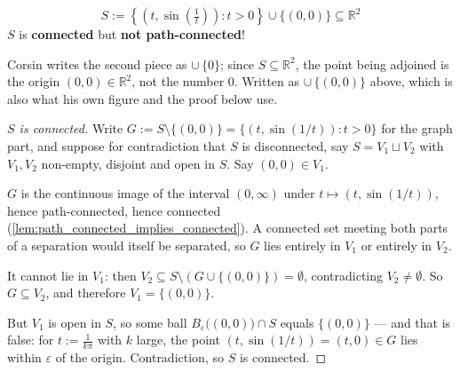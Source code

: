 \begin{example}
\label{ex:topologists_sine_curve}
\[S := \left\{\left(t, \sin\left(\tfrac{1}{t}\right)\right) : t > 0\right\} \cup \{(0,0)\} \subseteq \mathbb{R}^2\]
$S$ is \textbf{connected} but \textbf{not path-connected}!
\end{example}

\begin{ainote}
Corsin writes the second piece as $\cup\,\{0\}$; since $S \subseteq \mathbb{R}^2$, the point
being adjoined is the origin $(0,0) \in \mathbb{R}^2$, not the number $0$. Written as
$\cup\,\{(0,0)\}$ above, which is also what his own figure and the proof below use.
\end{ainote}

\begin{center}
\end{center}

\begin{proof}[$S$ is connected]
Write $G := S \setminus \{(0,0)\} = \{(t,\sin(1/t)) : t>0\}$ for the graph part, and suppose for
contradiction that $S$ is disconnected, say $S = V_1 \sqcup V_2$ with $V_1,V_2$ non-empty,
disjoint and open in $S$. Say $(0,0) \in V_1$.

$G$ is the continuous image of the interval $(0,\infty)$ under
$t \mapsto (t,\sin(1/t))$, hence path-connected, hence connected
(\cref{lem:path_connected_implies_connected}). A connected set meeting both parts of a
separation would itself be separated, so $G$ lies entirely in $V_1$ or entirely in $V_2$.

It cannot lie in $V_1$: then $V_2 \subseteq S \setminus (G \cup \{(0,0)\}) = \emptyset$,
contradicting $V_2 \neq \emptyset$. So $G \subseteq V_2$, and therefore
$V_1 = \{(0,0)\}$.

But $V_1$ is open in $S$, so some ball $B_\varepsilon\big((0,0)\big) \cap S$ equals
$\{(0,0)\}$ --- and that is false: for $t := \tfrac{1}{k\pi}$ with $k$ large, the point
$(t,\sin(1/t)) = (t,0) \in G$ lies within $\varepsilon$ of the origin. Contradiction, so $S$ is
connected.
\end{proof}

